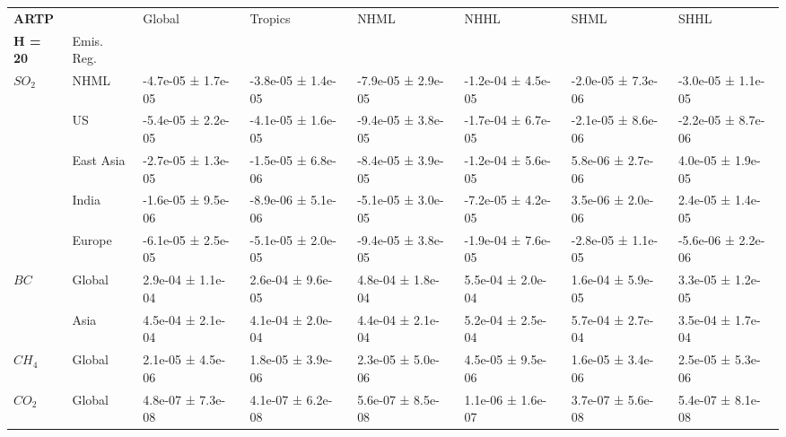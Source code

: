 \documentclass[preview]{standalone}
\newcommand{\nm}{\phantom{-}}
\begin{document}
	\tiny
	\begin{minipage}{\textwidth}
		\setlength\tabcolsep{5pt}
		\begin{tabular}{llllllll}
			\toprule
			\textbf{ARTP}  &      &               Global  &              Tropics &                 NHML &                 NHHL &                 SHML &                 SHHL \\
			\textbf{H = 20}      & Emis. Reg. &                      &                      &                      &                      &                      &                      \\
			\midrule
$SO_2$ & NHML &  -4.7e-05 ±  1.7e-05 &  -3.8e-05 ±  1.4e-05 &  -7.9e-05 ±  2.9e-05 &  -1.2e-04 ±  4.5e-05 &  -2.0e-05 ±  7.3e-06 &  -3.0e-05 ±  1.1e-05 \\
       & US &  -5.4e-05 ±  2.2e-05 &  -4.1e-05 ±  1.6e-05 &  -9.4e-05 ±  3.8e-05 &  -1.7e-04 ±  6.7e-05 &  -2.1e-05 ±  8.6e-06 &  -2.2e-05 ±  8.7e-06 \\
       & East Asia &  -2.7e-05 ±  1.3e-05 &  -1.5e-05 ±  6.8e-06 &  -8.4e-05 ±  3.9e-05 &  -1.2e-04 ±  5.6e-05 &   \nm5.8e-06 ±  2.7e-06 &   \nm4.0e-05 ±  1.9e-05 \\
       & India &  -1.6e-05 ±  9.5e-06 &  -8.9e-06 ±  5.1e-06 &  -5.1e-05 ±  3.0e-05 &  -7.2e-05 ±  4.2e-05 &   \nm3.5e-06 ±  2.0e-06 &   \nm2.4e-05 ±  1.4e-05 \\
       & Europe &  -6.1e-05 ±  2.5e-05 &  -5.1e-05 ±  2.0e-05 &  -9.4e-05 ±  3.8e-05 &  -1.9e-04 ±  7.6e-05 &  -2.8e-05 ±  1.1e-05 &  -5.6e-06 ±  2.2e-06 \\
\cmidrule(lr){1-8}
$BC$ & Global &   \nm2.9e-04 ±  1.1e-04 &   \nm2.6e-04 ±  9.6e-05 &   \nm4.8e-04 ±  1.8e-04 &   \nm5.5e-04 ±  2.0e-04 &   \nm1.6e-04 ±  5.9e-05 &   \nm3.3e-05 ±  1.2e-05 \\
       & Asia &   \nm4.5e-04 ±  2.1e-04 &   \nm4.1e-04 ±  2.0e-04 &   \nm4.4e-04 ±  2.1e-04 &   \nm5.2e-04 ±  2.5e-04 &   \nm5.7e-04 ±  2.7e-04 &   \nm3.5e-04 ±  1.7e-04 \\
\cmidrule(lr){1-8}
$CH_4$ & Global &   \nm2.1e-05 ±  4.5e-06 &   \nm1.8e-05 ±  3.9e-06 &   \nm2.3e-05 ±  5.0e-06 &   \nm4.5e-05 ±  9.5e-06 &   \nm1.6e-05 ±  3.4e-06 &   \nm2.5e-05 ±  5.3e-06 \\
\cmidrule(lr){1-8}
$CO_2$ & Global &   \nm4.8e-07 ±  7.3e-08 &   \nm4.1e-07 ±  6.2e-08 &   \nm5.6e-07 ±  8.5e-08 &   \nm1.1e-06 ±  1.6e-07 &   \nm3.7e-07 ±  5.6e-08 &   \nm5.4e-07 ±  8.1e-08 \\
\bottomrule
\end{tabular}

        \end{minipage}
        
\end{document}
